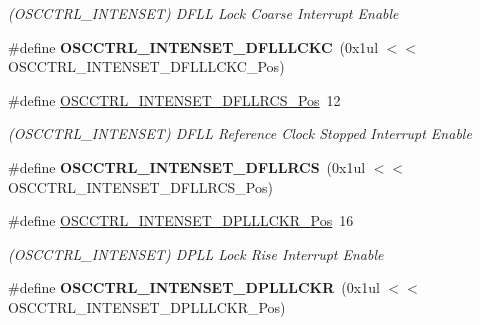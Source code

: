 \begin{DoxyCompactItemize}
\begin{DoxyCompactList}\small\item\em (O\+S\+C\+C\+T\+R\+L\+\_\+\+I\+N\+T\+E\+N\+S\+E\+T) D\+F\+L\+L Lock Coarse Interrupt Enable \end{DoxyCompactList}\item 
\hypertarget{group___s_a_m_l21___o_s_c_c_t_r_l_gae7856828416c59f854021b27541faf49}{}\#define {\bfseries O\+S\+C\+C\+T\+R\+L\+\_\+\+I\+N\+T\+E\+N\+S\+E\+T\+\_\+\+D\+F\+L\+L\+L\+C\+K\+C}~(0x1ul $<$$<$ O\+S\+C\+C\+T\+R\+L\+\_\+\+I\+N\+T\+E\+N\+S\+E\+T\+\_\+\+D\+F\+L\+L\+L\+C\+K\+C\+\_\+\+Pos)\label{group___s_a_m_l21___o_s_c_c_t_r_l_gae7856828416c59f854021b27541faf49}

\item 
\hypertarget{group___s_a_m_l21___o_s_c_c_t_r_l_ga67b99d880e5ac94cee8f4cece41756d5}{}\#define \hyperlink{group___s_a_m_l21___o_s_c_c_t_r_l_ga67b99d880e5ac94cee8f4cece41756d5}{O\+S\+C\+C\+T\+R\+L\+\_\+\+I\+N\+T\+E\+N\+S\+E\+T\+\_\+\+D\+F\+L\+L\+R\+C\+S\+\_\+\+Pos}~12\label{group___s_a_m_l21___o_s_c_c_t_r_l_ga67b99d880e5ac94cee8f4cece41756d5}

\begin{DoxyCompactList}\small\item\em (O\+S\+C\+C\+T\+R\+L\+\_\+\+I\+N\+T\+E\+N\+S\+E\+T) D\+F\+L\+L Reference Clock Stopped Interrupt Enable \end{DoxyCompactList}\item 
\hypertarget{group___s_a_m_l21___o_s_c_c_t_r_l_gacb67ce7e2240f3758da87efb27d5b596}{}\#define {\bfseries O\+S\+C\+C\+T\+R\+L\+\_\+\+I\+N\+T\+E\+N\+S\+E\+T\+\_\+\+D\+F\+L\+L\+R\+C\+S}~(0x1ul $<$$<$ O\+S\+C\+C\+T\+R\+L\+\_\+\+I\+N\+T\+E\+N\+S\+E\+T\+\_\+\+D\+F\+L\+L\+R\+C\+S\+\_\+\+Pos)\label{group___s_a_m_l21___o_s_c_c_t_r_l_gacb67ce7e2240f3758da87efb27d5b596}

\item 
\hypertarget{group___s_a_m_l21___o_s_c_c_t_r_l_ga19fdc19c864e9664ac437b3249e33d0c}{}\#define \hyperlink{group___s_a_m_l21___o_s_c_c_t_r_l_ga19fdc19c864e9664ac437b3249e33d0c}{O\+S\+C\+C\+T\+R\+L\+\_\+\+I\+N\+T\+E\+N\+S\+E\+T\+\_\+\+D\+P\+L\+L\+L\+C\+K\+R\+\_\+\+Pos}~16\label{group___s_a_m_l21___o_s_c_c_t_r_l_ga19fdc19c864e9664ac437b3249e33d0c}

\begin{DoxyCompactList}\small\item\em (O\+S\+C\+C\+T\+R\+L\+\_\+\+I\+N\+T\+E\+N\+S\+E\+T) D\+P\+L\+L Lock Rise Interrupt Enable \end{DoxyCompactList}\item 
\hypertarget{group___s_a_m_l21___o_s_c_c_t_r_l_gaea2ccc92bba83fb87c1d1f856442e3a5}{}\#define {\bfseries O\+S\+C\+C\+T\+R\+L\+\_\+\+I\+N\+T\+E\+N\+S\+E\+T\+\_\+\+D\+P\+L\+L\+L\+C\+K\+R}~(0x1ul $<$$<$ O\+S\+C\+C\+T\+R\+L\+\_\+\+I\+N\+T\+E\+N\+S\+E\+T\+\_\+\+D\+P\+L\+L\+L\+C\+K\+R\+\_\+\+Pos)\label{group___s_a_m_l21___o_s_c_c_t_r_l_gaea2ccc92bba83fb87c1d1f856442e3a5}


\end{DoxyCompactItemize}
